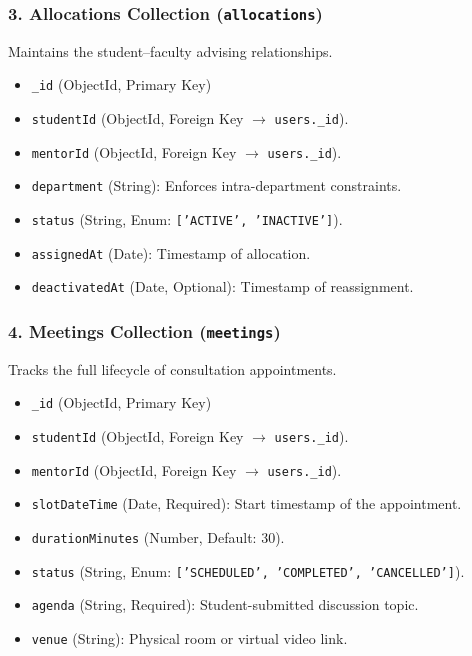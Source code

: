 \documentclass[11pt,a4paper]{article}
\begin{document}
\subsubsection{3. Allocations Collection (\texttt{allocations})}
Maintains the student--faculty advising relationships.
\begin{itemize}[leftmargin=1.4em, itemsep=0.15em]
  \item \texttt{\_id} (ObjectId, Primary Key)
  \item \texttt{studentId} (ObjectId, Foreign Key $\rightarrow$ \texttt{users.\_id}).
  \item \texttt{mentorId} (ObjectId, Foreign Key $\rightarrow$ \texttt{users.\_id}).
  \item \texttt{department} (String): Enforces intra-department constraints.
  \item \texttt{status} (String, Enum: \texttt{['ACTIVE', 'INACTIVE']}).
  \item \texttt{assignedAt} (Date): Timestamp of allocation.
  \item \texttt{deactivatedAt} (Date, Optional): Timestamp of reassignment.
\end{itemize}

\subsubsection{4. Meetings Collection (\texttt{meetings})}
Tracks the full lifecycle of consultation appointments.
\begin{itemize}[leftmargin=1.4em, itemsep=0.15em]
  \item \texttt{\_id} (ObjectId, Primary Key)
  \item \texttt{studentId} (ObjectId, Foreign Key $\rightarrow$ \texttt{users.\_id}).
  \item \texttt{mentorId} (ObjectId, Foreign Key $\rightarrow$ \texttt{users.\_id}).
  \item \texttt{slotDateTime} (Date, Required): Start timestamp of the appointment.
  \item \texttt{durationMinutes} (Number, Default: 30).
  \item \texttt{status} (String, Enum: \texttt{['SCHEDULED', 'COMPLETED', 'CANCELLED']}).
  \item \texttt{agenda} (String, Required): Student-submitted discussion topic.
  \item \texttt{venue} (String): Physical room or virtual video link.
\end{itemize}
\end{document}
